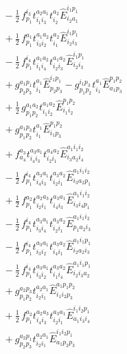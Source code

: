 \documentclass[11pt]{article}
\begin{document}
\begin{align}
&\quad - \tfrac{1}{2}\, f^{i_{3}}_{p_{1}} t^{a_{2}a_{1}}_{i_{1}i_{3}} t^{a_{2}}_{i_{2}} \hat{E}^{i_{1}p_{1}}_{i_{2}a_{1}} \\
&\quad + \tfrac{1}{2}\, f^{a_{1}}_{p_{1}} t^{a_{1}a_{2}}_{i_{3}i_{2}} t^{a_{2}}_{i_{1}} \hat{E}^{i_{1}p_{1}}_{i_{2}i_{3}} \\
&\quad - \tfrac{1}{2}\, f^{i_{4}}_{p_{1}} t^{a_{1}a_{2}}_{i_{1}i_{4}} t^{a_{1}a_{2}}_{i_{2}i_{3}} \hat{E}^{i_{1}p_{1}}_{i_{2}i_{3}} \\
&\quad + g^{a_{1}p_{1}}_{p_{2}p_{3}} t^{a_{1}}_{i_{1}} \hat{E}^{i_{1}p_{1}}_{p_{2}p_{3}} - g^{i_{1}p_{3}}_{p_{1}p_{2}} t^{a_{1}}_{i_{1}} \hat{E}^{p_{1}p_{2}}_{a_{1}p_{3}} \\
&\quad + \tfrac{1}{2}\, g^{a_{1}a_{2}}_{p_{1}p_{2}} t^{a_{1}a_{2}}_{i_{1}i_{2}} \hat{E}^{p_{1}p_{2}}_{i_{1}i_{2}} \\
&\quad + g^{a_{1}p_{3}}_{p_{1}p_{2}} t^{a_{1}}_{i_{1}} \hat{E}^{p_{1}p_{2}}_{i_{1}p_{3}} \\
&\quad + f^{a_{3}}_{a_{4}} t^{a_{3}a_{1}}_{i_{4}i_{3}} t^{a_{4}a_{2}}_{i_{2}i_{1}} \hat{E}^{a_{1}i_{1}i_{2}}_{i_{3}a_{2}i_{4}} \\
&\quad - \tfrac{1}{2}\, f^{i_{4}}_{p_{1}} t^{a_{3}a_{1}}_{i_{4}i_{3}} t^{a_{3}a_{2}}_{i_{2}i_{1}} \hat{E}^{a_{1}i_{1}i_{2}}_{i_{3}a_{2}p_{1}} \\
&\quad + \tfrac{1}{2}\, f^{a_{2}}_{p_{1}} t^{a_{2}a_{3}}_{i_{2}i_{1}} t^{a_{3}a_{1}}_{i_{4}i_{3}} \hat{E}^{a_{1}i_{1}i_{2}}_{i_{3}i_{4}p_{1}} \\
&\quad - \tfrac{1}{2}\, f^{i_{4}}_{p_{1}} t^{a_{3}a_{1}}_{i_{3}i_{4}} t^{a_{3}a_{2}}_{i_{2}i_{1}} \hat{E}^{a_{1}i_{1}i_{2}}_{p_{1}a_{2}i_{3}} \\
&\quad - \tfrac{1}{2}\, f^{i_{4}}_{p_{1}} t^{a_{3}a_{1}}_{i_{3}i_{2}} t^{a_{3}a_{2}}_{i_{4}i_{1}} \hat{E}^{a_{1}i_{1}p_{1}}_{i_{2}a_{2}i_{3}} \\
&\quad - \tfrac{1}{2}\, f^{i_{4}}_{p_{1}} t^{a_{3}a_{1}}_{i_{3}i_{2}} t^{a_{3}a_{2}}_{i_{1}i_{4}} \hat{E}^{a_{1}i_{1}p_{1}}_{i_{2}i_{3}a_{2}} \\
&\quad + g^{a_{2}p_{3}}_{p_{1}p_{2}} t^{a_{2}a_{1}}_{i_{2}i_{1}} \hat{E}^{a_{1}p_{1}p_{2}}_{i_{1}i_{2}p_{3}} \\
&\quad + \tfrac{1}{2}\, f^{a_{2}}_{p_{1}} t^{a_{2}a_{3}}_{i_{4}i_{3}} t^{a_{3}a_{1}}_{i_{2}i_{1}} \hat{E}^{i_{1}i_{2}p_{1}}_{a_{1}i_{3}i_{4}} \\
&\quad + g^{a_{2}p_{1}}_{p_{2}p_{3}} t^{a_{2}a_{1}}_{i_{2}i_{1}} \hat{E}^{i_{1}i_{2}p_{1}}_{a_{1}p_{2}p_{3}}
\end{align}
\end{document}
